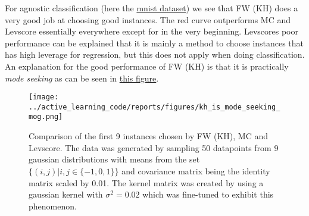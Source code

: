 For agnostic classification (here the
\hyperref[fig:learning-curve-mnist-agnostic-experiments]{mnist dataset}) we see
that FW (KH) does a very good job at choosing good instances. The red curve
outperforms MC and Levscore essentially everywhere except for in the very
beginning. Levscores poor performance can be explained that it is mainly a
method to choose instances that has high leverage for regression, but this does
not apply when doing classification. An explanation for the good performance of
FW (KH) is that it is practically \textit{mode seeking} as can be seen in
\hyperref[fig:kh-is-mode-seeking]{this figure}.

\begin{figure}[h]
  \centering
  \label{fig:kh-is-mode-seeking}
  \texttt{[image: ../active\_learning\_code/reports/figures/kh\_is\_mode\_seeking\_mog.png]}
  \caption{Comparison of the first 9 instances chosen by FW (KH), MC and
    Levscore. The data was generated by sampling 50 datapoints from 9 gaussian
    distributions with means from the set \(\{(i, j)| i, j \in \{-1, 0, 1\}\}\)  and covariance matrix being the
    identity matrix scaled by 0.01. The kernel matrix was created by using a
    gaussian kernel with \(\sigma^{2} = 0.02\) which was fine-tuned to exhibit
    this phenomenon.}
\end{figure}